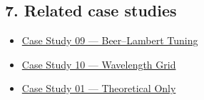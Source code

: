 \documentclass[
  11pt,
]{article}
\providecommand{\tightlist}{
  \setlength{\itemsep}{0pt}\setlength{\parskip}{0pt}}
\begin{document}
\hypertarget{7-related-case-studies}{
\subsection{7. Related case studies}\label{7-related-case-studies}}

\begin{itemize}
\tightlist
\item
  \href{https://github.com/pinarsyt/overlap-calculator/blob/main/case_studies/09_beer_lambert_tuning/README.md}{Case
  Study 09 --- Beer--Lambert Tuning}
\item
  \href{https://github.com/pinarsyt/overlap-calculator/blob/main/case_studies/10_wavelength_grid/README.md}{Case
  Study 10 --- Wavelength Grid}
\item
  \href{https://github.com/pinarsyt/overlap-calculator/blob/main/case_studies/01_theoretical_only/README.md}{Case
  Study 01 --- Theoretical Only}
\end{itemize}
\end{document}
